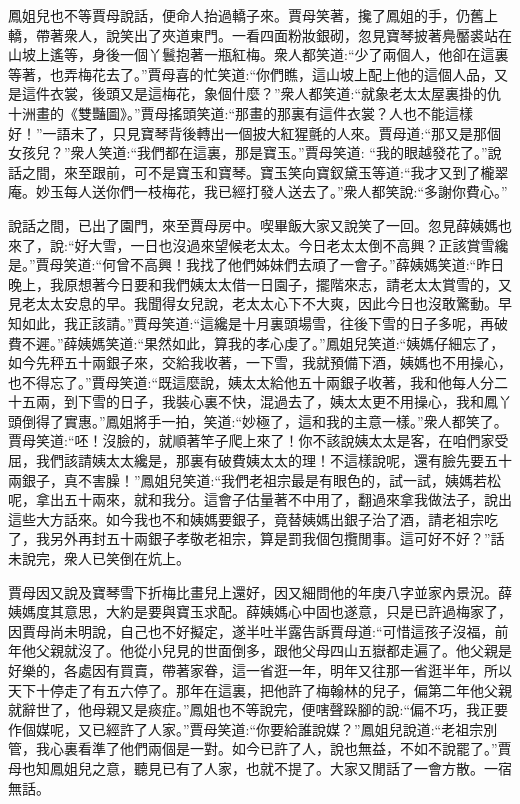 \begin{parag}
    鳳姐兒也不等賈母說話，便命人抬過轎子來。賈母笑著，攙了鳳姐的手，仍舊上轎，帶著衆人，說笑出了夾道東門。一看四面粉妝銀砌，忽見寶琴披著鳧靨裘站在山坡上遙等，身後一個丫鬟抱著一瓶紅梅。衆人都笑道:“少了兩個人，他卻在這裏等著，也弄梅花去了。”賈母喜的忙笑道:“你們瞧，這山坡上配上他的這個人品，又是這件衣裳，後頭又是這梅花，象個什麼？”衆人都笑道:“就象老太太屋裏掛的仇十洲畫的《雙豔圖》。”賈母搖頭笑道:“那畫的那裏有這件衣裳？人也不能這樣好！”一語未了，只見寶琴背後轉出一個披大紅猩氈的人來。賈母道:“那又是那個女孩兒？”衆人笑道:“我們都在這裏，那是寶玉。”賈母笑道: “我的眼越發花了。”說話之間，來至跟前，可不是寶玉和寶琴。寶玉笑向寶釵黛玉等道:“我才又到了櫳翠庵。妙玉每人送你們一枝梅花，我已經打發人送去了。”衆人都笑說:“多謝你費心。”
\end{parag}


\begin{parag}
    說話之間，已出了園門，來至賈母房中。喫畢飯大家又說笑了一回。忽見薛姨媽也來了，說:“好大雪，一日也沒過來望候老太太。今日老太太倒不高興？正該賞雪纔是。”賈母笑道:“何曾不高興！我找了他們姊妹們去頑了一會子。”薛姨媽笑道:“昨日晚上，我原想著今日要和我們姨太太借一日園子，擺階來志，請老太太賞雪的，又見老太太安息的早。我聞得女兒說，老太太心下不大爽，因此今日也沒敢驚動。早知如此，我正該請。”賈母笑道:“這纔是十月裏頭場雪，往後下雪的日子多呢，再破費不遲。”薛姨媽笑道:“果然如此，算我的孝心虔了。”鳳姐兒笑道:“姨媽仔細忘了，如今先秤五十兩銀子來，交給我收著，一下雪，我就預備下酒，姨媽也不用操心，也不得忘了。”賈母笑道:“既這麼說，姨太太給他五十兩銀子收著，我和他每人分二十五兩，到下雪的日子，我裝心裏不快，混過去了，姨太太更不用操心，我和鳳丫頭倒得了實惠。”鳳姐將手一拍，笑道:“妙極了，這和我的主意一樣。”衆人都笑了。賈母笑道:“呸！沒臉的，就順著竿子爬上來了！你不該說姨太太是客，在咱們家受屈，我們該請姨太太纔是，那裏有破費姨太太的理！不這樣說呢，還有臉先要五十兩銀子，真不害臊！”鳳姐兒笑道:“我們老祖宗最是有眼色的，試一試，姨媽若松呢，拿出五十兩來，就和我分。這會子估量著不中用了，翻過來拿我做法子，說出這些大方話來。如今我也不和姨媽要銀子，竟替姨媽出銀子治了酒，請老祖宗吃了，我另外再封五十兩銀子孝敬老祖宗，算是罰我個包攬閒事。這可好不好？”話未說完，衆人已笑倒在炕上。
\end{parag}


\begin{parag}
    賈母因又說及寶琴雪下折梅比畫兒上還好，因又細問他的年庚八字並家內景況。薛姨媽度其意思，大約是要與寶玉求配。薛姨媽心中固也遂意，只是已許過梅家了，因賈母尚未明說，自己也不好擬定，遂半吐半露告訴賈母道:“可惜這孩子沒福，前年他父親就沒了。他從小兒見的世面倒多，跟他父母四山五嶽都走遍了。他父親是好樂的，各處因有買賣，帶著家眷，這一省逛一年，明年又往那一省逛半年，所以天下十停走了有五六停了。那年在這裏，把他許了梅翰林的兒子，偏第二年他父親就辭世了，他母親又是痰症。”鳳姐也不等說完，便嗐聲跺腳的說:“偏不巧，我正要作個媒呢，又已經許了人家。”賈母笑道:“你要給誰說媒？”鳳姐兒說道:“老祖宗別管，我心裏看準了他們兩個是一對。如今已許了人，說也無益，不如不說罷了。”賈母也知鳳姐兒之意，聽見已有了人家，也就不提了。大家又閒話了一會方散。一宿無話。
\end{parag}


